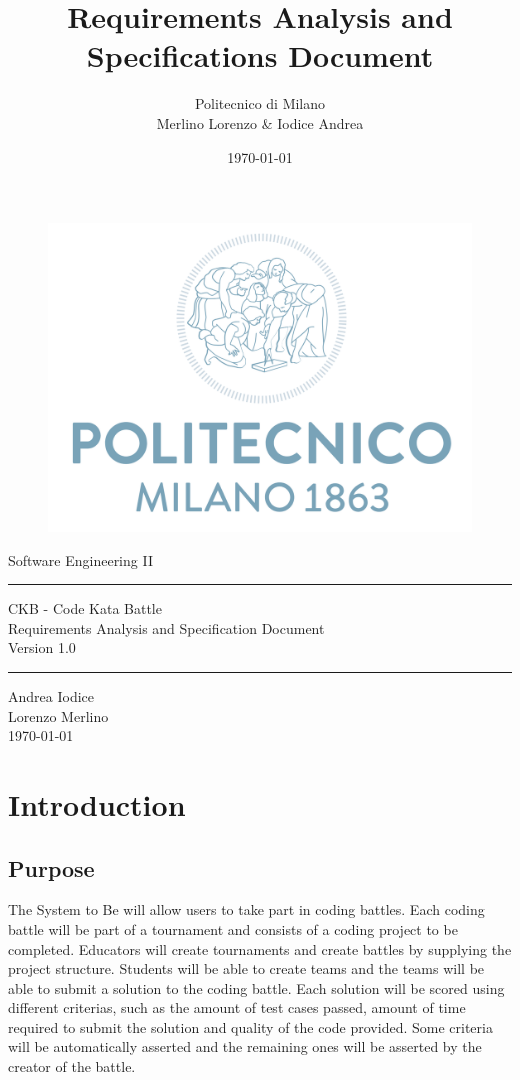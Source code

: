 \documentclass{article}
\title{Requirements Analysis and Specifications Document}
\author{
	Politecnico di Milano\\
	Merlino Lorenzo \& Iodice Andrea
}
\date{\today}
\begin{document}
\begin{center}
\vspace{3cm}
    \begin{figure}
    \centering
    \includegraphics[width=0.5\linewidth]{images/PoliLogo.png}
\end{figure}
{\huge Software Engineering II}
\vspace{1cm}
\bigskip %
\hrule %
\bigskip %
\vspace{1cm}
{\huge CKB - Code Kata Battle}\\
\vspace{1cm}
{\huge Requirements Analysis and Specification Document}\\
\bigskip
Version 1.0\\
\vspace{1cm}
\bigskip
\hrule
\bigskip
\vspace{1cm}
{\huge Andrea Iodice\\
Lorenzo Merlino\\}
\bigskip
\vspace{1cm}
{\large \today}
\end{center}
\newpage
\maketitle
\tableofcontents
\newpage
\section{Introduction}
\subsection{Purpose}
The System to Be will allow users to take part in coding battles. Each coding battle will be part of a tournament and consists of a coding project to be completed.
Educators will create tournaments and create battles by supplying the project structure. 
Students will be able to create teams and the teams will be able to submit a solution to the coding battle. Each solution will be scored using different criterias, such as the amount of test cases passed, amount of time required to submit the solution and quality of the code provided.
Some criteria will be automatically asserted and the remaining ones will be asserted by the creator of the battle.
\end{document}
